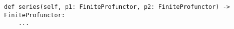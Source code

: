 \begin{verbatim}
def series(self, p1: FiniteProfunctor, p2: FiniteProfunctor) -> FiniteProfunctor:
    ...
\end{verbatim}